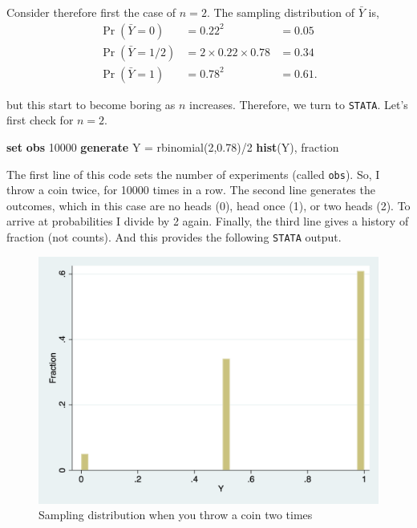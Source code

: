 \documentclass[
]{book}
\newenvironment{Shaded}{\begin{snugshade}}{\end{snugshade}}
\newcommand{\KeywordTok}[1]{\textcolor[rgb]{0.13,0.29,0.53}{\textbf{#1}}}
\newcommand{\NormalTok}[1]{#1}
\begin{document}
Consider therefore first the case of \(n = 2\). The sampling distribution of \(\bar{Y}\) is,
\begin{eqnarray} 
\Pr(\bar{Y}  = 0) &= 0.22^2 &= 0.05 \\
\Pr(\bar{Y}  = 1/2) &=  2 \times 0.22 \times 0.78 &= 0.34\\
\Pr(\bar{Y}  = 1) &= 0.78^2 &= 0.61. 
\end{eqnarray}

but this start to become boring as \(n\) increases. Therefore, we turn to \texttt{STATA}. Let's first check for \(n = 2\).

\begin{Shaded}
\begin{Highlighting}[]
\KeywordTok{set} \KeywordTok{obs}\NormalTok{ 10000}
\KeywordTok{generate}\NormalTok{ Y = rbinomial(2,0.78)/2 }
\KeywordTok{hist}\NormalTok{(Y), fraction}
\end{Highlighting}
\end{Shaded}

The first line of this code sets the number of experiments (called \texttt{obs}). So, I throw a coin twice, for 10000 times in a row. The second line generates the outcomes, which in this case are no heads (0), head once (1), or two heads (2). To arrive at probabilities I divide by 2 again. Finally, the third line gives a history of fraction (not counts). And this provides the following \texttt{STATA} output.

\begin{figure}
\includegraphics[width=18.33in]{./figures/coin1} \caption{Sampling distribution when you throw a coin two times}\label{fig:coin1}
\end{figure}
\end{document}
